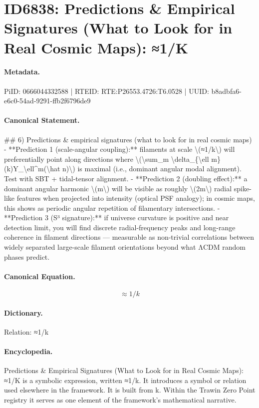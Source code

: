 \section*{ID6838: Predictions \& Empirical Signatures (What to Look for in Real Cosmic Maps): ≈1/K}
\paragraph{Metadata.}
PiID: 0666044332588 | RTEID: RTE:P26553.4726:T6.0528 | UUID: b8adbfa6-e6c0-54ad-9291-ffb2f6796de9

\paragraph{Canonical Statement.}
\#\# 6) Predictions \& empirical signatures (what to look for in real cosmic maps) - **Prediction 1 (scale-angular coupling):** filaments at scale \textbackslash{}(≈1/k\textbackslash{}) will preferentially point along directions where \textbackslash{}(\textbackslash{}sum\_m \textbackslash{}delta\_\{\textbackslash{}ell m\}(k)Y\_\textbackslash{}ell\textasciicircum{}m(\textbackslash{}hat n)\textbackslash{}) is maximal (i.e., dominant angular modal alignment). Test with SBT + tidal-tensor alignment. - **Prediction 2 (doubling effect):** a dominant angular harmonic \textbackslash{}(m\textbackslash{}) will be visible as roughly \textbackslash{}(2m\textbackslash{}) radial spike-like features when projected into intensity (optical PSF analogy); in cosmic maps, this shows as periodic angular repetition of filamentary intersections. - **Prediction 3 (S³ signature):** if universe curvature is positive and near detection limit, you will find discrete radial-frequency peaks and long-range coherence in filament directions — measurable as non-trivial correlations between widely separated large-scale filament orientations beyond what ΛCDM random phases predict.

\paragraph{Canonical Equation.}
\[
≈1/k
\]

\paragraph{Dictionary.}
Relation: ≈1/k

\paragraph{Encyclopedia.}
Predictions \& Empirical Signatures (What to Look for in Real Cosmic Maps): ≈1/K is a symbolic expression, written ≈1/k. It introduces a symbol or relation used elsewhere in the framework. It is built from k. Within the Trawin Zero Point registry it serves as one element of the framework's mathematical narrative.
